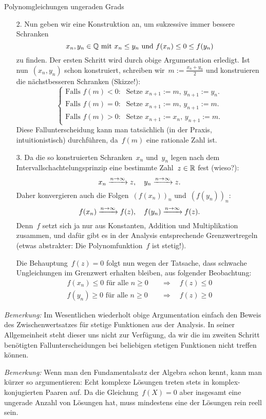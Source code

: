 \documentclass{algblatt}
\begin{document}
\begin{aufgabe}{Polynomgleichungen ungeraden Grads}
\begin{loesung}
\begin{enumerate}
\item[2.] Nun geben wir eine Konstruktion an, um sukzessive immer bessere
Schranken
\[ x_n, y_n \in \mathbb{Q} \text{ mit } x_n \leq y_n \text{ und } f(x_n) \leq 0 \leq
f(y_n) \]
zu finden. Der ersten Schritt wird durch obige Argumentation erledigt. Ist
nun~$(x_n,y_n)$ schon konstruiert, schreiben wir~$m := \frac{x_n + y_n}{2}$
und konstruieren die nächstbesseren Schranken (Skizze!):
\[ \begin{cases}
  \text{Falls~$f(m) < 0$:} &
    \text{Setze $x_{n+1} := m$, $y_{n+1} := y_n$.} \\
  \text{Falls~$f(m) = 0$:} &
    \text{Setze $x_{n+1} := m$, $y_{n+1} := m$.} \\
  \text{Falls~$f(m) > 0$:} &
    \text{Setze $x_{n+1} := x_n$, $y_{n+1} := m$.}
\end{cases} \]
Diese Fallunterscheidung kann man tatsächlich (in der Praxis, intuitionistisch)
durchführen, da~$f(m)$ eine rationale Zahl ist.
\item[3.] Da die so konstruierten Schranken~$x_n$ und~$y_n$ legen nach dem
Intervallschachtelungsprinzip eine bestimmte Zahl~$z \in \mathbb{R}$ fest (wieso?):
\[ x_n \xrightarrow{n \to \infty} z, \quad y_n \xrightarrow{n \to \infty} z. \]
Daher konvergieren auch die Folgen~$(f(x_n))_n$ und~$(f(y_n))_n$:
\[ f(x_n) \xrightarrow{n \to \infty} f(z), \quad f(y_n) \xrightarrow{n \to \infty} f(z). \]
Denn~$f$ setzt sich ja nur aus Konstanten, Addition und Multiplikation
zusammen, und dafür gibt es in der Analysis entsprechende Grenzwertregeln
(etwas abstrakter: Die Polynomfunktion~$f$ ist stetig!).

Die Behauptung~$f(z) = 0$ folgt nun wegen der Tatsache, dass schwache
Ungleichungen im Grenzwert erhalten bleiben, aus folgender Beobachtung:
\begin{align*}
  \text{$f(x_n) \leq 0$ für alle~$n \geq 0$} &\quad\Longrightarrow\quad f(z) \leq 0 \\
  \text{$f(y_n) \geq 0$ für alle~$n \geq 0$} &\quad\Longrightarrow\quad f(z) \geq 0
\end{align*}
\end{enumerate}

\emph{Bemerkung:} Im Wesentlichen wiederholt obige Argumentation einfach den
Beweis des Zwischenwertsatzes für stetige Funktionen aus der Analysis. In
seiner Allgemeinheit steht dieser uns nicht zur Verfügung, da wir die im
zweiten Schritt benötigten Fallunterscheidungen bei beliebigen stetigen
Funktionen nicht treffen können.

\emph{Bemerkung:} Wenn man den Fundamentalsatz der Algebra schon kennt, kann
man kürzer so argumentieren: Echt komplexe Lösungen treten stets in
komplex-konjugierten Paaren auf. Da die Gleichung~$f(X) = 0$ aber insgesamt
eine ungerade Anzahl von Lösungen hat, muss mindestens eine der Lösungen rein
reell sein.
\end{loesung}
\end{aufgabe}
\end{document}
